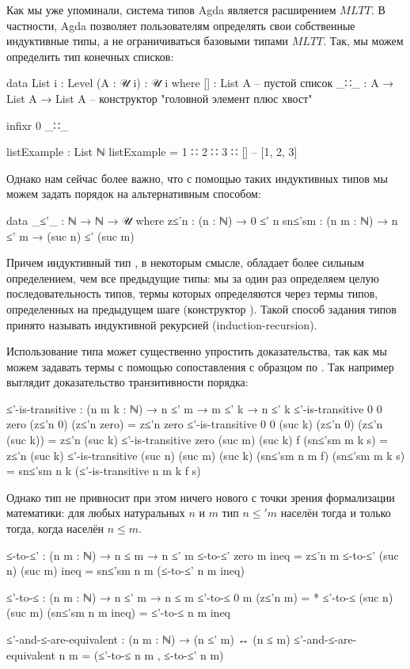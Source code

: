 \documentclass{article}[12pt]
\begin{document}
Как мы уже упоминали, система типов Agda является расширением $MLTT$. В частности, Agda позволяет
пользователям определять свои собственные индуктивные типы, а не ограничиваться базовыми
типами $MLTT$. Так, мы можем определить тип конечных списков:
\begin{code}
data List {i : Level} (A : 𝒰 i) : 𝒰 i where
    [] : List A -- пустой список
    _∷_ : A → List A → List A -- конструктор "головной элемент плюс хвост"

infixr 0 _∷_

listExample : List ℕ
listExample = 1 ∷ 2 ∷ 3 ∷ [] -- [1, 2, 3]
\end{code}
Однако нам сейчас более важно, что с помощью таких индуктивных типов мы можем задать порядок
на  альтернативным способом:
\begin{code}
data _≤'_ : ℕ → ℕ → 𝒰 where
    z≤'n : (n : ℕ) → 0 ≤' n
    sn≤'sm : (n m : ℕ) → n ≤' m → (suc n) ≤' (suc m) 
\end{code}
Причем индуктивный тип , в некоторым смысле, обладает более сильным определением,
чем все предыдущие типы: мы за один раз определяем целую последовательность типов, термы которых
определяются через термы типов, определенных на предыдущем шаге (конструктор ).
Такой способ задания типов принято называть индуктивной рекурсией (induction-recursion).

Использование типа  может существенно упростить доказательства, так как мы можем
задавать термы с помощью сопоставления с образцом по . Так например
выглядит доказательство транзитивности порядка:
\begin{code}
≤'-is-transitive : (n m k : ℕ) → n ≤' m → m ≤' k → n ≤' k
≤'-is-transitive 0 0 zero (z≤'n 0) (z≤'n zero) = z≤'n zero
≤'-is-transitive 0 0 (suc k) (z≤'n 0) (z≤'n (suc k)) = z≤'n (suc k)
≤'-is-transitive zero (suc m) (suc k) f (sn≤'sm m k s) = z≤'n (suc k)
≤'-is-transitive (suc n) (suc m) (suc k) (sn≤'sm n m f) (sn≤'sm m k s) 
                 = sn≤'sm n k (≤'-is-transitive n m k f s)
\end{code}
Однако тип  не привносит при этом ничего нового с точки зрения формализации математики:
для любых натуральных $n$ и $m$ тип $n \leq' m$ населён тогда и только тогда, когда населён $n \leq m$.
\begin{code}
≤-to-≤' : (n m : ℕ) → n ≤ m → n ≤' m
≤-to-≤' zero m ineq = z≤'n m
≤-to-≤' (suc n) (suc m) ineq = sn≤'sm n m (≤-to-≤' n m ineq)

≤'-to-≤ : (n m : ℕ) → n ≤' m → n ≤ m
≤'-to-≤ 0 m (z≤'n m) = *
≤'-to-≤ (suc n) (suc m) (sn≤'sm n m ineq) = ≤'-to-≤ n m ineq

≤'-and-≤-are-equivalent : (n m : ℕ) → (n ≤' m) ↔ (n ≤ m)
≤'-and-≤-are-equivalent n m = (≤'-to-≤ n m , ≤-to-≤' n m)
\end{code}
\end{document}
